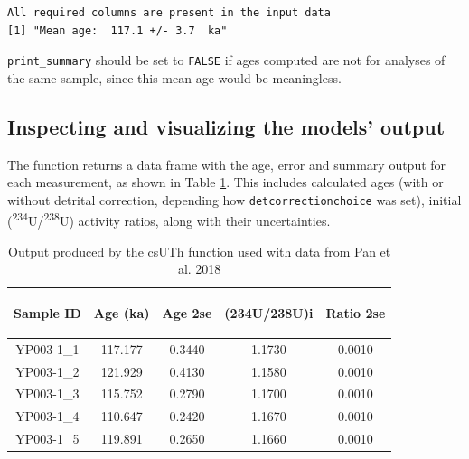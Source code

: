 \documentclass[]{elsarticle} %
\begin{document}
\begin{verbatim}
All required columns are present in the input data
[1] "Mean age:  117.1 +/- 3.7  ka"
\end{verbatim}

\texttt{print\_summary} should be set to \texttt{FALSE} if ages computed are not for analyses of the same sample, since this mean age would be meaningless.

\hypertarget{inspecting-and-visualizing-the-models-output}{%
\subsection{Inspecting and visualizing the models' output}\label{inspecting-and-visualizing-the-models-output}}

The function returns a data frame with the age, error and summary output for each measurement, as shown in Table \ref{tab:panoutput}. This includes calculated ages (with or without detrital correction, depending how \texttt{detcorrectionchoice} was set), initial (\textsuperscript{234}U/\textsuperscript{238}U) activity ratios, along with their uncertainties.

\begin{table}[ht]
\centering
\begin{tabular}{ccccc}
  \hline
\begin{sideways} Sample ID \end{sideways} & \begin{sideways} Age (ka) \end{sideways} & \begin{sideways} Age 2se \end{sideways} & \begin{sideways} (234U/238U)i \end{sideways} & \begin{sideways} Ratio 2se \end{sideways} \\ 
  \hline
YP003-1\_1 & 117.177 & 0.3440 & 1.1730 & 0.0010 \\ 
  YP003-1\_2 & 121.929 & 0.4130 & 1.1580 & 0.0010 \\ 
  YP003-1\_3 & 115.752 & 0.2790 & 1.1700 & 0.0010 \\ 
  YP003-1\_4 & 110.647 & 0.2420 & 1.1670 & 0.0010 \\ 
  YP003-1\_5 & 119.891 & 0.2650 & 1.1660 & 0.0010 \\ 
   \hline
\end{tabular}
\caption{\label{tab:panoutput}Output produced by the csUTh function used with data from Pan et al. 2018} 
\end{table}
\end{document}
